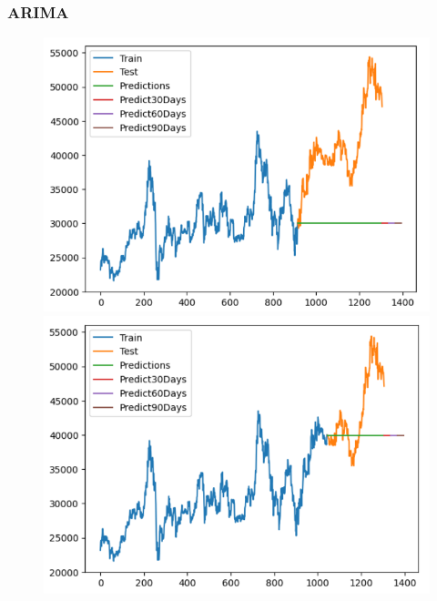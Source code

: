 \subsubsection{ARIMA}
\begin{figure}[H]
    \centering
    \begin{minipage}{0.15\textwidth}
    \centering
    \includegraphics[width=1\textwidth]{resources/chapter-5/newdata1/result/BIDV_ARIMA_7-3.png}
    \end{minipage}
    \hfill
    \begin{minipage}{0.15\textwidth}
    \centering
    \includegraphics[width=1\textwidth]{resources/chapter-5/newdata1/result/BIDV_ARIMA_8-2.png}
    \end{minipage}
    \hfill
        \begin{minipage}{0.15\textwidth}

\end{minipage}
\end{figure}
